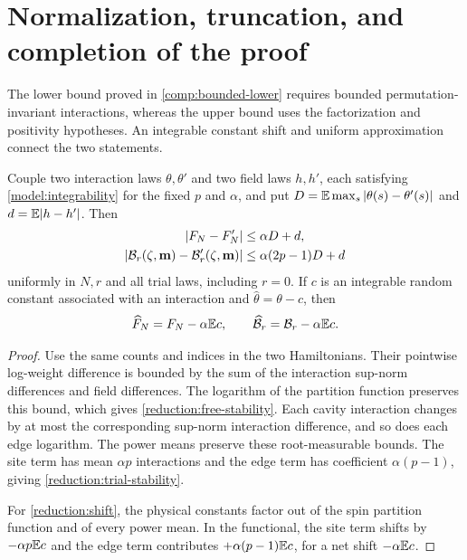 \section{Normalization, truncation, and completion of the proof}
\label{reduction:section}

The lower bound proved in \cref{comp:bounded-lower} requires bounded
permutation-invariant interactions, whereas the upper bound uses the
factorization and positivity hypotheses. An integrable constant shift
and uniform approximation connect the two statements.

\begin{lemma}[Stability]\label{reduction:stability}
Couple two interaction laws $\theta,\theta'$ and two field laws $h,h'$,
each satisfying \eqref{model:integrability} for the fixed $p$ and $\alpha$,
and put $D=\mathbb E\max_s|\theta(s)-\theta'(s)|$ and
$d=\mathbb E|h-h'|$. Then
\begin{align}
 |F_N-F_N'|&\le\alpha D+d,\label{reduction:free-stability}\\
 |\mathcal B_r(\zeta,\mathbf m)-\mathcal B_r'(\zeta,\mathbf m)|
 &\le\alpha(2p-1)D+d\label{reduction:trial-stability}
\end{align}
uniformly in $N,r$ and all trial laws, including $r=0$.
If $c$ is an integrable random constant associated with an interaction and
$\widehat\theta=\theta-c$, then
\begin{equation}\label{reduction:shift}
 \widehat F_N=F_N-\alpha\mathbb E c,
 \qquad\widehat{\mathcal B}_r=\mathcal B_r-\alpha\mathbb E c.
\end{equation}
\end{lemma}

\begin{proof}
Use the same counts and indices in the two Hamiltonians. Their pointwise
log-weight difference is bounded by the sum of the interaction sup-norm
differences and field differences. The logarithm of the partition function
preserves this bound, which gives \eqref{reduction:free-stability}.
Each cavity interaction changes by at most the corresponding sup-norm
interaction difference, and so does each edge logarithm. The power means
preserve these root-measurable bounds. The site term has mean $\alpha p$
interactions and the edge term has coefficient $\alpha(p-1)$, giving
\eqref{reduction:trial-stability}.

For \eqref{reduction:shift}, the physical constants factor out of the spin
partition function and of every power mean. In the functional, the site
term shifts by $-\alpha p\mathbb E c$ and the edge term contributes
$+\alpha(p-1)\mathbb E c$, for a net shift $-\alpha\mathbb E c$.
\end{proof}

